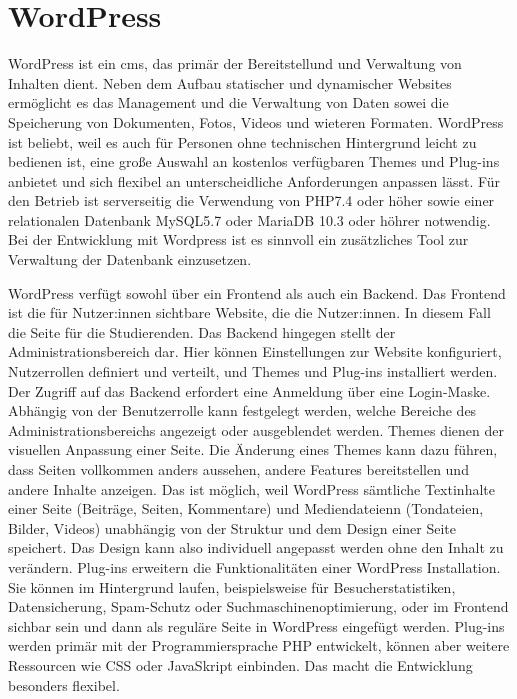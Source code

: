 \section{WordPress}\label{sec:WordPress}
WordPress ist ein \gls{cms}, das primär der Bereitstellund und Verwaltung von Inhalten dient. Neben dem Aufbau statischer und dynamischer Websites ermöglicht es das Management und die Verwaltung von Daten sowei die Speicherung von Dokumenten, Fotos, Videos und wieteren Formaten. WordPress ist beliebt, weil es auch für Personen ohne technischen Hintergrund leicht zu bedienen ist, eine große Auswahl an kostenlos verfügbaren Themes und Plug-ins anbietet und sich flexibel an unterscheidliche Anforderungen anpassen lässt. 
Für den Betrieb ist serverseitig die Verwendung von PHP7.4 oder höher sowie einer relationalen Datenbank MySQL5.7 oder MariaDB 10.3 oder höhrer notwendig. Bei der Entwicklung mit Wordpress ist es sinnvoll ein zusätzliches Tool zur Verwaltung der Datenbank einzusetzen. 

WordPress verfügt sowohl über ein Frontend als auch ein Backend. Das Frontend ist die für Nutzer:innen sichtbare Website, die die Nutzer:innen. In diesem Fall die Seite für die Studierenden. Das Backend hingegen stellt der Administrationsbereich dar. Hier können Einstellungen zur Website konfiguriert, Nutzerrollen definiert und verteilt, und Themes und Plug-ins installiert werden. Der Zugriff auf das Backend erfordert eine Anmeldung über eine Login-Maske. Abhängig von der Benutzerrolle kann festgelegt werden, welche Bereiche des Administrationsbereichs angezeigt oder ausgeblendet werden.  Themes dienen der visuellen Anpassung einer Seite. Die Änderung eines Themes kann dazu führen, dass Seiten vollkommen anders aussehen, andere Features bereitstellen und andere Inhalte anzeigen. Das ist möglich, weil WordPress sämtliche Textinhalte einer Seite (Beiträge, Seiten, Kommentare) und Mediendateienn (Tondateien, Bilder, Videos) unabhängig von der Struktur und dem Design einer Seite speichert. Das Design kann also individuell angepasst werden ohne den Inhalt zu verändern.  Plug-ins erweitern die Funktionalitäten einer WordPress Installation. Sie können im Hintergrund laufen, beispielsweise für Besucherstatistiken, Datensicherung, Spam-Schutz oder Suchmaschinenoptimierung, oder im Frontend sichbar sein und dann als reguläre Seite in WordPress eingefügt werden. Plug-ins werden primär mit der Programmiersprache PHP entwickelt, können aber weitere Ressourcen wie CSS oder JavaSkript einbinden. Das macht die Entwicklung besonders flexibel. 
